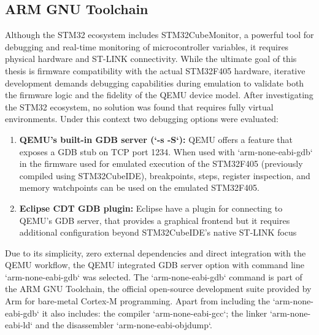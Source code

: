 \subsection{ARM GNU Toolchain}
\label{chap:Back_ARM_Toolchain}

Although the STM32 ecosystem includes STM32CubeMonitor\cite{STM32CubeMonitor2026}, a powerful tool 
for debugging and real-time monitoring of microcontroller variables, it requires 
physical hardware and ST-LINK connectivity. While the ultimate goal of this thesis is 
firmware compatibility with the actual STM32F405 hardware, iterative development 
demands debugging capabilities during emulation to validate both the firmware logic 
and the fidelity of the QEMU device model. After investigating the STM32 ecosystem, 
no solution was found that requires fully virtual environments. Under this 
context two debugging options were evaluated:

\begin{enumerate}
    \item \textbf{QEMU's built-in GDB server (`-s -S`):} 
        QEMU offers a feature that exposes a GDB stub on TCP port 1234. When used with `arm-none-eabi-gdb` in the firmware used for emulated execution of the STM32F405 (previously compiled using STM32CubeIDE), breakpoints, steps, register inspection, and memory watchpoints can be used on the emulated STM32F405.
    \item \textbf{Eclipse CDT GDB plugin:} 
        Eclipse have a plugin for connecting to QEMU's GDB server, that provides a graphical frontend but it requires additional configuration beyond STM32CubeIDE's native ST-LINK focus
\end{enumerate}

    
Due to its simplicity, zero external dependencies and direct integration with 
the QEMU workflow, the QEMU integrated GDB server option with command 
line `arm-none-eabi-gdb` was selected. The `arm-none-eabi-gdb` command is part 
of the ARM GNU Toolchain, the official open-source development suite provided 
by Arm for bare-metal Cortex-M programming. Apart from including the `arm-none-eabi-gdb` 
it also includes: the compiler `arm-none-eabi-gcc`; the linker `arm-none-eabi-ld` 
and the disassembler `arm-none-eabi-objdump`\cite{ArmGNU2026}\cite{ArmDocumentation2026}.